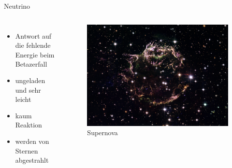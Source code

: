 \documentclass[aspectratio=169,xcolor=dvipsnames]{beamer}
\begin{document}
\begin{frame}{Neutrino}
    \begin{columns}[c]
        \begin{itemize}
            \item Antwort auf die fehlende Energie beim Betazerfall
            \item ungeladen und sehr leicht
            \item kaum Reaktion
            \item werden von Sternen abgestrahlt
        \end{itemize}
        \begin{figure}
            \includegraphics[width=0.7\linewidth]{figures/supernova1.jpg}
            \caption{Supernova}
            \label{fig:super}
        \end{figure}

    \end{columns}
\end{frame}
\end{document}
